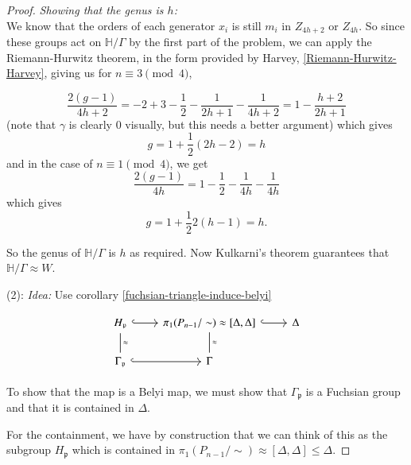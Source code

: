 \documentclass[reqno]{amsart}
\theoremstyle{definition}
\theoremstyle{remark}
\begin{document}
\begin{proof}
\textit{Showing that the genus is $h$:}\\

We know that the orders of each
generator $x_i$ is still $m_i$ in $Z_{4h+2}$ or
$Z_{4h}$. So since these groups act on
$\mathbb{H}/ \Gamma$ by the first part of the problem, we can apply the Riemann-Hurwitz theorem, in the form provided by Harvey, \eqref{Riemann-Hurwitz-Harvey}, giving us for $n \equiv 3 \pmod{4}$,

\[\frac{2 (g-1)}{4h+2} = 
-2 + 3 - \frac{1}{2} - \frac{1}{2h+1} - \frac{1}{4h+2}
= 1 - \frac{h+2}{2h+1}\]
(note that $\gamma$ is clearly $0$ visually, but this needs a better argument) which gives
\[g = 1 + \frac{1}{2} \left( 2h-2 \right)
= h \]
and in the case of $n \equiv 1 \pmod{4}$,
we get
\[\frac{2(g-1)}{4h}
= 1 - \frac{1}{2} - \frac{1}{4h} - \frac{1}{4h}\]
which gives
\[g = 1 + \frac{1}{2} 2(h-1) = h.\]


So the genus of $\mathbb{H}/\Gamma$ is $h$
as required. Now Kulkarni's theorem guarantees that $\mathbb{H}/\Gamma \approx W$.\\
\linebreak







(2): 
\textit{Idea:} Use corollary \ref{fuchsian-triangle-induce-belyi}

\begin{equation*}
            \begin{tikzcd}
                H_{\mathfrak{p}} 
                \ar[d, dash, "\approx"]\ar[r,
                hookrightarrow] & \pi_1 (P_{n-1}/\sim) \approx
                \left[\Delta, \Delta \right]\ar[d, dash, "\approx"]
                \ar[r,hookrightarrow]&
                \Delta
                \\
                \Gamma_{\mathfrak{p}} 
                \ar[r, hookrightarrow]&
                \Gamma
            \end{tikzcd}
        \end{equation*}

        To show that the map is
        a Belyi map, we must show that $\Gamma_{\mathfrak{p}}$ is a Fuchsian group and that it is
        contained in $\Delta$.

        For the containment, we have by
        construction that we can think
        of this as the subgroup
        $H_{\mathfrak{p}}$ which
        is contained in
        $\pi_1 (P_{n-1}/\sim) 
        \approx \left[ \Delta, \Delta
        \right] \leq \Delta$.


\end{proof}
\end{document}
